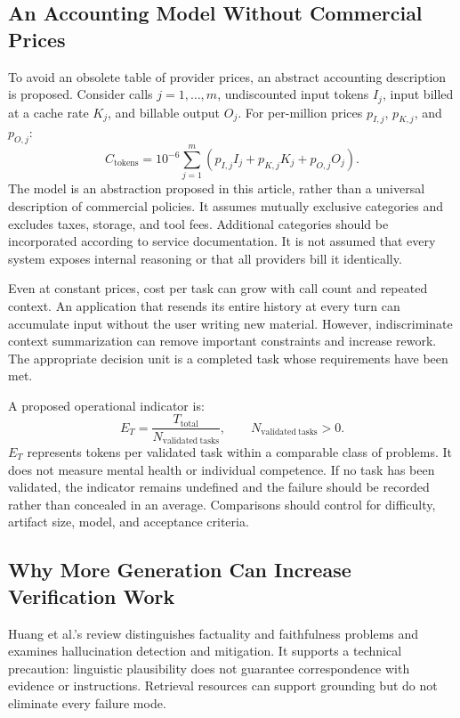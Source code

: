 \documentclass[11pt,a4paper]{article}
\begin{document}
\subsection{An Accounting Model Without Commercial Prices}
To avoid an obsolete table of provider prices, an abstract accounting description is proposed. Consider calls $j=1,\ldots,m$, undiscounted input tokens $I_j$, input billed at a cache rate $K_j$, and billable output $O_j$. For per-million prices $p_{I,j}$, $p_{K,j}$, and $p_{O,j}$:
\begin{equation}
C_{\mathrm{tokens}}=10^{-6}\sum_{j=1}^{m}\left(p_{I,j}I_j+p_{K,j}K_j+p_{O,j}O_j\right).
\end{equation}
The model is an abstraction proposed in this article, rather than a universal description of commercial policies. It assumes mutually exclusive categories and excludes taxes, storage, and tool fees. Additional categories should be incorporated according to service documentation. It is not assumed that every system exposes internal reasoning or that all providers bill it identically.

Even at constant prices, cost per task can grow with call count and repeated context. An application that resends its entire history at every turn can accumulate input without the user writing new material. However, indiscriminate context summarization can remove important constraints and increase rework. The appropriate decision unit is a completed task whose requirements have been met.

A proposed operational indicator is:
\begin{equation}
E_T=\frac{T_{\mathrm{total}}}{N_{\mathrm{validated\ tasks}}},
\qquad N_{\mathrm{validated\ tasks}}>0.
\end{equation}
$E_T$ represents tokens per validated task within a comparable class of problems. It does not measure mental health or individual competence. If no task has been validated, the indicator remains undefined and the failure should be recorded rather than concealed in an average. Comparisons should control for difficulty, artifact size, model, and acceptance criteria.

\subsection{Why More Generation Can Increase Verification Work}
Huang et al.'s review \cite{huang} distinguishes factuality and faithfulness problems and examines hallucination detection and mitigation. It supports a technical precaution: linguistic plausibility does not guarantee correspondence with evidence or instructions. Retrieval resources can support grounding but do not eliminate every failure mode.
\end{document}
